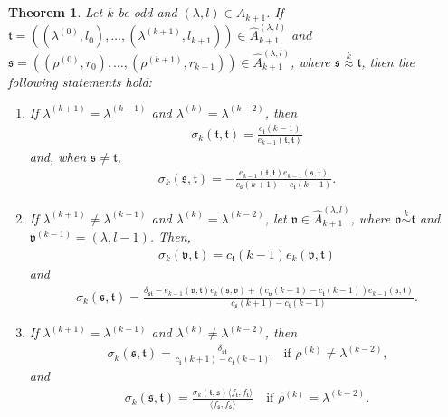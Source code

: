 \documentclass[11pt,a4paper,reqno,svgnames]{amsart}
\theoremstyle{plain}
\newtheorem{theorem}{Theorem}[section]
\theoremstyle{definition}
\numberwithin{equation}{section}
\begin{document}
\begin{theorem}\label{sigmaodd}
Let $k$ be odd and $(\lambda,{l})\in\hat{A}_{k+1}$. If  $\mathfrak{t}=((\lambda^{(0)},l_0),\ldots,(\lambda^{(k+1)},l_{k+1}))\in\hat{A}_{k+1}^{(\lambda,{l})}$ and  $\mathfrak{s}=((\rho^{(0)},r_0),\ldots,(\rho^{(k+1)},r_{k+1}))\in\hat{A}_{k+1}^{(\lambda,l)}$, where $\mathfrak{s}\stackrel{k}{\approx}\mathfrak{t}$, then the following statements hold:
\begin{enumerate}[label=(\arabic{*}), ref=\arabic{*},leftmargin=0pt,itemindent=1.5em]
\item\label{sigmaodd.1} If $\lambda^{(k+1)}=\lambda^{(k-1)}$ and $\lambda^{(k)}=\lambda^{(k-2)}$, then 
\begin{align}\label{sigmaodd.1.2}
\sigma_{k}(\mathfrak{t,t})=\frac{c_\mathfrak{t}(k-1)}{e_{k-1}(\mathfrak{t,t})}
\end{align}
and, when $\mathfrak{s}\ne\mathfrak{t}$,
\begin{align}\label{sigmaodd.1.1}
\sigma_{k}(\mathfrak{s},\mathfrak{t})= -\frac{e_{k-1}(\mathfrak{t,t})e_{k-1}(\mathfrak{s,t})}{c_\mathfrak{s}(k+1)-c_\mathfrak{t}(k-1)}.
\end{align}
\item\label{sigmaodd.2} If $\lambda^{(k+1)}\ne\lambda^{(k-1)}$ and $\lambda^{(k)}=\lambda^{(k-2)}$,  let $\mathfrak{v}\in\hat{A}_{k+1}^{(\lambda,l)}$, where $\mathfrak{v}\stackrel{k}{\sim}\mathfrak{t}$ and $\mathfrak{v}^{(k-1)}=(\lambda,l-1)$. Then, 
\begin{align}\label{sigmaodd.2.1} 
\sigma_k(\mathfrak{v,t})=c_\mathfrak{t}(k-1)e_k(\mathfrak{v,t})
\end{align}
and
\begin{align}\label{sigmaodd.2.2} 
\sigma_k(\mathfrak{s,t}) =\frac{\delta_\mathfrak{st} -e_{k-1}(\mathfrak{v,t})e_k(\mathfrak{s,v}) +(c_\mathfrak{v}(k-1) -c_\mathfrak{t}(k-1))e_{k-1}(\mathfrak{s,t})}{c_\mathfrak{s}(k+1)-c_\mathfrak{t}(k-1)}.
\end{align}
\item\label{sigmaodd.3} If $\lambda^{(k+1)}=\lambda^{(k-1)}$ and $\lambda^{(k)}\ne\lambda^{(k-2)}$, then 
\begin{align}\label{sigmaodd.3.1} 
\sigma_{k}(\mathfrak{s},\mathfrak{t})=
\frac{\delta_\mathfrak{st}}{c_\mathfrak{t}(k+1)-c_\mathfrak{t}(k-1)}\quad\text{if $\rho^{(k)}\ne\lambda^{(k-2)}$,}
\end{align}
and 
\begin{align}\label{sigmaodd.3.2}
\sigma_k(\mathfrak{s,t})=\frac{\sigma_k(\mathfrak{t,s})\langle f_\mathfrak{t},f_\mathfrak{t}\rangle}{\langle f_\mathfrak{s},f_\mathfrak{s}\rangle}\quad\text{if $\rho^{(k)}=\lambda^{(k-2)}$.}

\end{align}
\end{enumerate}
\end{theorem}
\end{document}

